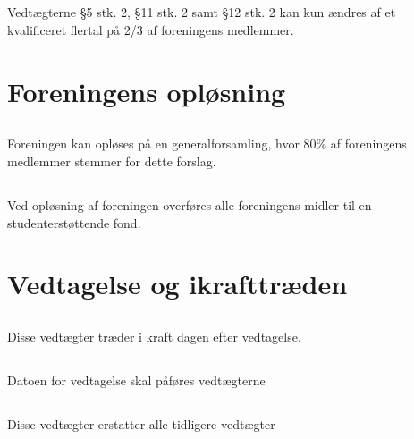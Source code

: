 \documentclass[danish,a4paper,twocolumn,oneside,article]{memoir}
\begin{document}
\section{} Vedtægterne \S 5 stk. 2, §11 stk. 2 samt \S 12 stk. 2 kan kun ændres af et kvalificeret flertal på 2/3 af
foreningens medlemmer.


\chapter{Foreningens opløsning}

\section{} Foreningen kan opløses på en generalforsamling, hvor 80\% af foreningens medlemmer stemmer
for dette forslag.

\section{} Ved opløsning af foreningen overføres alle foreningens midler til en studenterstøttende fond.

\chapter{Vedtagelse og ikrafttræden}

\section{} Disse vedtægter træder i kraft dagen efter vedtagelse.

\section{} Datoen for vedtagelse skal påføres vedtægterne

\section{} Disse vedtægter erstatter alle tidligere vedtægter
\end{document}
